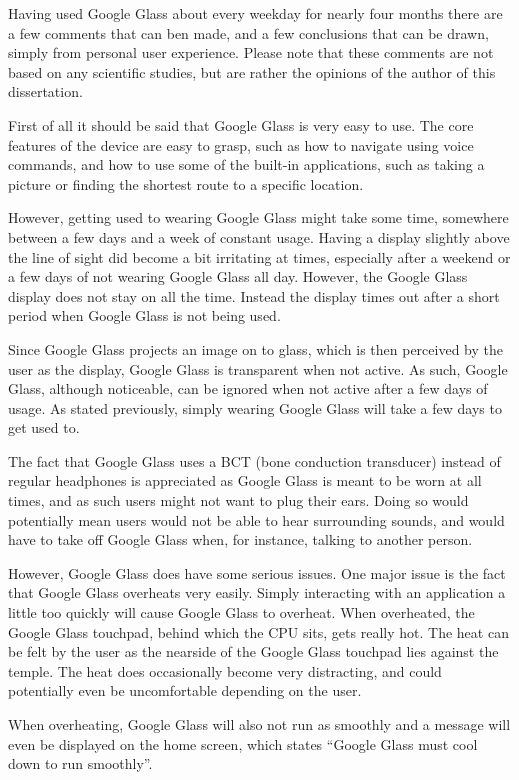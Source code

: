 Having used Google Glass about every weekday for nearly four months there are a few comments that can ben made, and a few conclusions that can be drawn, simply from personal user experience. Please note that these comments are not based on any scientific studies, but are rather the opinions of the author of this dissertation.

First of all it should be said that Google Glass is very easy to use. The core features of the device are easy to grasp, such as how to navigate using voice commands, and how to use some of the built-in applications, such as taking a picture or finding the shortest route to a specific location.

However, getting used to wearing Google Glass might take some time, somewhere between a few days and a week of constant usage. Having a display slightly above the line of sight did become a bit irritating at times, especially after a weekend or a few days of not wearing Google Glass all day. However, the Google Glass display does not stay on all the time. Instead the display times out after a short period when Google Glass is not being used.

Since Google Glass projects an image on to glass, which is then perceived by the user as the display, Google Glass is transparent when not active. As such, Google Glass, although noticeable, can be ignored when not active after a few days of usage. As stated previously, simply wearing Google Glass will take a few days to get used to.

The fact that Google Glass uses a BCT (bone conduction transducer) instead of regular headphones is appreciated as Google Glass is meant to be worn at all times, and as such users might not want to plug their ears. Doing so would potentially mean users would not be able to hear surrounding sounds, and would have to take off Google Glass when, for instance, talking to another person.

However, Google Glass does have some serious issues. One major issue is the fact that Google Glass overheats very easily. Simply interacting with an application a little too quickly will cause Google Glass to overheat. When overheated, the Google Glass touchpad, behind which the CPU sits, gets really hot. The heat can be felt by the user as the nearside of the Google Glass touchpad lies against the temple. The heat does occasionally become very distracting, and could potentially even be uncomfortable depending on the user.

When overheating, Google Glass will also not run as smoothly and a message will even be displayed on the home screen, which states ``Google Glass must cool down to run smoothly''.


